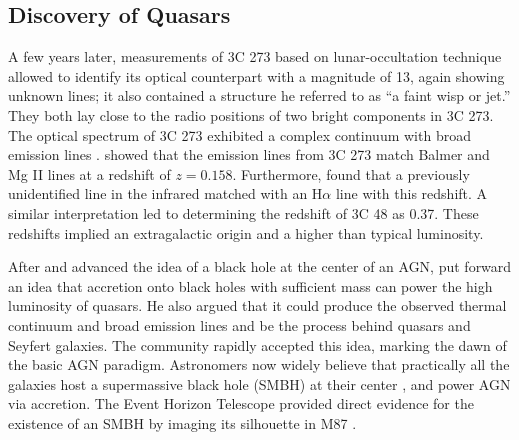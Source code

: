 \subsection{Discovery of Quasars}
A few years later, measurements of 3C 273 based on lunar-occultation technique allowed  \citet{schmidt19633c} to identify its optical counterpart with a magnitude of 13, again showing unknown lines; it also contained a structure he referred to as ``a faint wisp or jet.'' They both lay close to the radio positions of two bright components in 3C 273. The optical spectrum of  3C 273 exhibited a complex continuum with broad emission lines \citep{oke1963absolute}.
\citet{schmidt19633c} showed that the emission lines from 3C 273 match Balmer and Mg II lines at a redshift of $z=0.158$. Furthermore, \citep{oke1963absolute} found that a previously unidentified line in the infrared matched with an H$\alpha$ line with this redshift. A similar interpretation led to determining the redshift of 3C 48 as 0.37. These redshifts implied an extragalactic origin and a higher than typical luminosity.

After \citet{salpeter1964accretion} and \citet{zel1964estimating} advanced the idea of a black hole at the center of an AGN, \citet{lynden1969galactic} put forward an idea that accretion onto black holes with sufficient mass can power the high luminosity of quasars. He also argued that it could produce the observed thermal continuum and broad emission lines and be the process behind quasars and Seyfert galaxies. The community rapidly accepted this idea, marking the dawn of the basic AGN paradigm. Astronomers now widely believe that practically all the galaxies host a supermassive black hole (SMBH) at their center \citep[e.g.,][]{richstone1998supermassive}, and power AGN via accretion. The Event Horizon Telescope provided direct evidence for the existence of an SMBH by imaging its silhouette in M87 \citep{2019ApJ...875L...1E}.

